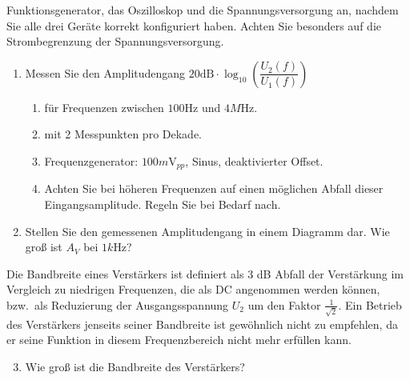 \documentclass[10pt]{scrreprt}
\begin{document}
    Funktionsgenerator, das Oszilloskop und die Spannungsversorgung an, nachdem Sie alle
    drei Geräte korrekt konfiguriert haben. Achten Sie besonders auf die Strombegrenzung
    der Spannungsversorgung.
    \begin{enumerate}
        \item Messen Sie den Amplitudengang $20 \text{dB} \cdot \log_{10} \left( \dfrac{U_2(f)}{U_1(f)} \right)$
            \begin{enumerate}
                \item für Frequenzen zwischen $100\si{\hertz}$ und $4\si{M\hertz}$.
                \item mit 2 Messpunkten pro Dekade.
                \item Frequenzgenerator: $100 \si{m\volt}_{pp}$, Sinus, deaktivierter Offset.
                \item Achten Sie bei höheren Frequenzen auf einen möglichen Abfall dieser
                    Eingangsamplitude. Regeln Sie bei Bedarf nach.
            \end{enumerate}
        \item Stellen Sie den gemessenen Amplitudengang in einem Diagramm dar. Wie groß ist
            $A_V$ bei $1\si{k\hertz}$?
    \end{enumerate}
    Die Bandbreite eines Verstärkers ist definiert als 3 dB Abfall der Verstärkung im Vergleich
    zu niedrigen Frequenzen, die als DC angenommen werden können, bzw.\ als Reduzierung
    der Ausgangsspannung $U_2$ um den Faktor $\frac{1}{\sqrt{2}}$. Ein Betrieb des Verstärkers jenseits seiner
    Bandbreite ist gewöhnlich nicht zu empfehlen, da er seine Funktion in diesem
    Frequenzbereich nicht mehr erfüllen kann.
    \begin{enumerate}
        \setcounter{enumi}{2}
        \item Wie groß ist die Bandbreite des Verstärkers?
    \end{enumerate}
\end{document}
